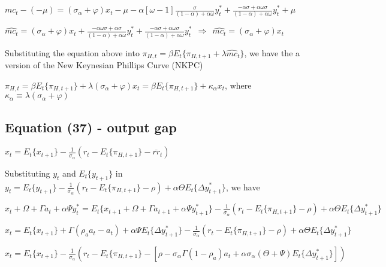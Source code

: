 \documentclass[
]{article}
\begin{document}
\(\displaystyle mc_t-(-\mu)=(\sigma_\alpha+\varphi)x_t - \mu - \alpha \left[ \omega-1 \right] \frac{\sigma}{(1-\alpha)+\alpha \omega} y_t^* + \frac{-\alpha \sigma +\alpha \omega\sigma}{(1-\alpha)+\alpha \omega} y_t^* + \mu\)

\(\displaystyle \widehat{mc_t}=(\sigma_\alpha+\varphi)x_t + \frac{-\alpha \omega \sigma + \alpha \sigma}{(1-\alpha)+\alpha \omega} y_t^* + \frac{-\alpha \sigma +\alpha \omega\sigma}{(1-\alpha)+\alpha \omega} y_t^* \ \ \Rightarrow \ \ \widehat{mc_t}=(\sigma_\alpha+\varphi)x_t\)

Substituting the equation above into
\(\pi_{H,t} = \beta E_t \{ \pi_{H,t+1} + \lambda \widehat{mc}_t\}\), we
have the a version of the New Keynesian Phillips Curve (NKPC)

\(\pi_{H,t} = \beta E_t \{ \pi_{H,t+1}\} + \lambda (\sigma_\alpha+\varphi)x_t = \beta E_t \{ \pi_{H,t+1}\} + \kappa_\alpha x_t\),
where \(\kappa_\alpha \equiv \lambda (\sigma_\alpha+\varphi)\)

\vspace{12pt}

\hypertarget{equation-37---output-gap}{%
\subsection{Equation (37) - output gap}\label{equation-37---output-gap}}

\(\displaystyle x_t = E_t\{x_{t+1}\} -\frac{1}{\sigma_\alpha}(r_t-E_t\{\pi_{H,t+1}\} -\overline{rr}_t)\)

\vspace{8pt}

Substituting \(y_t\) and \(E_t\{y_{t+1}\}\) in
\(\displaystyle y_t= E_t\{y_{t+1}\} -\frac{1}{\sigma_\alpha}(r_t-E_t\{\pi_{H,t+1}\} -\rho)+ \alpha \Theta E_t\{\Delta y_{t+1}^*\}\),
we have

\(x_t + \Omega+\Gamma a_t+ \alpha \Psi y_t^* = E_t\{x_{t+1} + \Omega+\Gamma a_{t+1}+ \alpha \Psi y_{t+1}^*\} -\frac{1}{\sigma_\alpha}(r_t-E_t\{\pi_{H,t+1}\} -\rho)+ \alpha \Theta E_t\{\Delta y_{t+1}^*\}\)

\(\displaystyle x_t = E_t\{x_{t+1}\} +\Gamma (\rho_a a_{t}-a_t)+ \alpha \Psi E_t\{\Delta y_{t+1}^*\} -\frac{1}{\sigma_\alpha}(r_t-E_t\{\pi_{H,t+1}\} -\rho)+ \alpha \Theta E_t\{\Delta y_{t+1}^*\}\)

\(\displaystyle x_t = E_t\{x_{t+1}\} -\frac{1}{\sigma_\alpha}(r_t-E_t\{\pi_{H,t+1}\} -[\rho-\sigma_\alpha \Gamma (1-\rho_a)a_t +\alpha \sigma_\alpha(\Theta+\Psi) E_t\{\Delta y_{t+1}^*\}])\)
\end{document}
